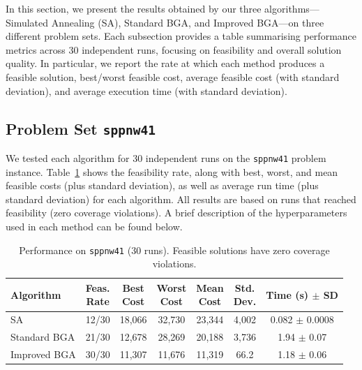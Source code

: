 \documentclass[12pt]{article}
\begin{document}
In this section, we present the results obtained by our three algorithms---Simulated Annealing (SA), Standard BGA, and Improved BGA---on three different problem sets. Each subsection provides a table summarising performance metrics across 30 independent runs, focusing on feasibility and overall solution quality. In particular, we report the rate at which each method produces a feasible solution, best/worst feasible cost, average feasible cost (with standard deviation), and average execution time (with standard deviation).

\subsection{Problem Set \texttt{sppnw41}}
\label{subsec:sppnw41}

We tested each algorithm for 30 independent runs on the \texttt{sppnw41} problem instance. 
Table~\ref{tab:sppnw41} shows the feasibility rate, along with best, worst, and mean feasible costs (plus standard deviation), as well as average run time (plus standard deviation) for each algorithm. 
All results are based on runs that reached feasibility (zero coverage violations). 
A brief description of the hyperparameters used in each method can be found below.

\vspace{1em}

\begin{table}[htbp]
  \centering
  \label{tab:sppnw41}
  \renewcommand{\arraystretch}{1.1}
  \begin{tabular}{lcccccc}
    \hline
    \textbf{Algorithm} & \makecell{Feas.\\Rate} & \makecell{Best\\Cost} & \makecell{Worst\\Cost} & \makecell{Mean\\Cost} & \makecell{Std.\\Dev.} & \makecell{Time\\(s) $\pm$ SD}\\
    \hline
    SA            
      & 12/30 
      & 18,066
      & 32,730 
      & 23,344
      & 4,002 
      & 0.082 $\pm$ 0.0008 \\
    Standard BGA 
      & 21/30 
      & 12,678 
      & 28,269 
      & 20,188 
      & 3,736 
      & 1.94 $\pm$ 0.07 \\
    Improved BGA 
      & 30/30 
      & 11,307 
      & 11,676
      & 11,319 
      & 66.2
      & 1.18 $\pm$ 0.06 \\
    \hline
  \end{tabular}
  \caption{Performance on \texttt{sppnw41} (30 runs). Feasible solutions have zero coverage violations.}
\end{table}
\end{document}
